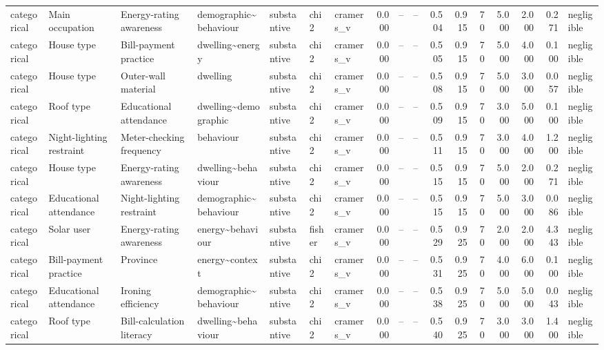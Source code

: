 \begin{table}
\begin{tabular}{lllllllrrrrrrrrrl}
categorical & Main occupation & Energy-rating awareness & demographic\textasciitilde behaviour & substantive & chi2 & cramers\_v & 0.000 & -- & -- & 0.504 & 0.915 & 70 & 5.000 & 2.000 & 0.271 & negligible \\
categorical & House type & Bill-payment practice & dwelling\textasciitilde energy & substantive & chi2 & cramers\_v & 0.000 & -- & -- & 0.505 & 0.915 & 70 & 5.000 & 4.000 & 0.100 & negligible \\
categorical & House type & Outer-wall material & dwelling & substantive & chi2 & cramers\_v & 0.000 & -- & -- & 0.508 & 0.915 & 70 & 5.000 & 3.000 & 0.057 & negligible \\
categorical & Roof type & Educational attendance & dwelling\textasciitilde demographic & substantive & chi2 & cramers\_v & 0.000 & -- & -- & 0.509 & 0.915 & 70 & 3.000 & 5.000 & 0.100 & negligible \\
categorical & Night-lighting restraint & Meter-checking frequency & behaviour & substantive & chi2 & cramers\_v & 0.000 & -- & -- & 0.511 & 0.915 & 70 & 3.000 & 4.000 & 1.200 & negligible \\
categorical & House type & Energy-rating awareness & dwelling\textasciitilde behaviour & substantive & chi2 & cramers\_v & 0.000 & -- & -- & 0.515 & 0.915 & 70 & 5.000 & 2.000 & 0.271 & negligible \\
categorical & Educational attendance & Night-lighting restraint & demographic\textasciitilde behaviour & substantive & chi2 & cramers\_v & 0.000 & -- & -- & 0.515 & 0.915 & 70 & 5.000 & 3.000 & 0.086 & negligible \\
categorical & Solar user & Energy-rating awareness & energy\textasciitilde behaviour & substantive & fisher & cramers\_v & 0.000 & -- & -- & 0.529 & 0.925 & 70 & 2.000 & 2.000 & 4.343 & negligible \\
categorical & Bill-payment practice & Province & energy\textasciitilde context & substantive & chi2 & cramers\_v & 0.000 & -- & -- & 0.531 & 0.925 & 70 & 4.000 & 6.000 & 0.100 & negligible \\
categorical & Educational attendance & Ironing efficiency & demographic\textasciitilde behaviour & substantive & chi2 & cramers\_v & 0.000 & -- & -- & 0.538 & 0.925 & 70 & 5.000 & 5.000 & 0.043 & negligible \\
categorical & Roof type & Bill-calculation literacy & dwelling\textasciitilde behaviour & substantive & chi2 & cramers\_v & 0.000 & -- & -- & 0.540 & 0.925 & 70 & 3.000 & 3.000 & 1.400 & negligible \\

\end{tabular}
\end{table}
